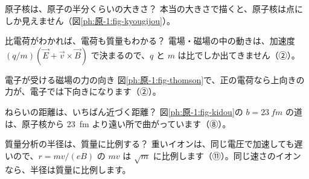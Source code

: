 \begin{tsumazuki}{原子核は、原子の半分くらいの大きさ？}
本当の大きさで描くと、原子核は点にしか見えません（図\ref{ph:原-1:fig-kyougijou}）。
\end{tsumazuki}

\begin{tsumazuki}{比電荷がわかれば、電荷も質量もわかる？}
電場・磁場の中の動きは、加速度 $(q/m)(\vec E+\vec v\times\vec B)$ で決まるので、$q$ と $m$ は比でしか出てきません（②）。
\end{tsumazuki}

\begin{tsumazuki}{電子が受ける磁場の力の向き}
図\ref{ph:原-1:fig-thomson}で、正の電荷なら上向きの力が、電子では下向きになります（②）。
\end{tsumazuki}

\begin{tsumazuki}{ねらいの距離は、いちばん近づく距離？}
図\ref{ph:原-1:fig-kidou}の $b=\qty{23}{fm}$ の道は、原子核から \qty{23}{fm} より遠い所で曲がっています（⑧）。
\end{tsumazuki}

\begin{tsumazuki}{質量分析の半径は、質量に比例する？}
重いイオンは、同じ電圧で加速しても遅いので、$r=mv/(eB)$ の $mv$ は $\sqrt m$ に比例します（⑪）。同じ速さのイオンなら、半径は質量に比例します。
\end{tsumazuki}


